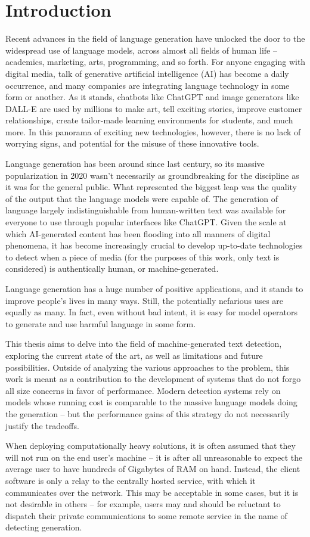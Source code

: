 \section{Introduction}
\label{sec:introduction}

Recent advances in the field of language generation have unlocked the door to the widespread use of language models, across almost all fields of human life -- academics, marketing, arts, programming, and so forth.
For anyone engaging with digital media, talk of generative artificial intelligence (AI) has become a daily occurrence, and many companies are integrating language technology in some form or another.
As it stands, chatbots like ChatGPT and image generators like DALL-E are used by millions to make art, tell exciting stories, improve customer relationships, create tailor-made learning environments for students, and much more.
In this panorama of exciting new technologies, however, there is no lack of worrying signs, and potential for the misuse of these innovative tools.

Language generation has been around since last century, so its massive popularization in 2020 wasn't necessarily as groundbreaking for the discipline as it was for the general public.
What represented the biggest leap was the quality of the output that the language models were capable of.
The generation of language largely indistinguishable from human-written text was available for everyone to use through popular interfaces like ChatGPT.
Given the scale at which AI-generated content has been flooding into all manners of digital phenomena, it has become increasingly crucial to develop up-to-date technologies to detect when a piece of media (for the purposes of this work, only text is considered) is authentically human, or machine-generated.

Language generation has a huge number of positive applications, and it stands to improve people's lives in many ways. Still, the potentially nefarious uses are equally as many.
In fact, even without bad intent, it is easy for model operators to generate and use harmful language in some form.

This thesis aims to delve into the field of machine-generated text detection, exploring the current state of the art, as well as limitations and future possibilities.
Outside of analyzing the various approaches to the problem, this work is meant as a contribution to the development of systems that do not forgo all size concerns in favor of performance.
Modern detection systems rely on models whose running cost is comparable to the massive language models doing the generation -- but the performance gains of this strategy do not necessarily justify the tradeoffs.

When deploying computationally heavy solutions, it is often assumed that they will not run on the end user's machine -- it is after all unreasonable to expect the average user to have hundreds of Gigabytes of RAM on hand.
Instead, the client software is only a relay to the centrally hosted service, with which it communicates over the network.
This may be acceptable in some cases, but it is not desirable in others -- for example, users may and should be reluctant to dispatch their private communications to some remote service in the name of detecting generation.